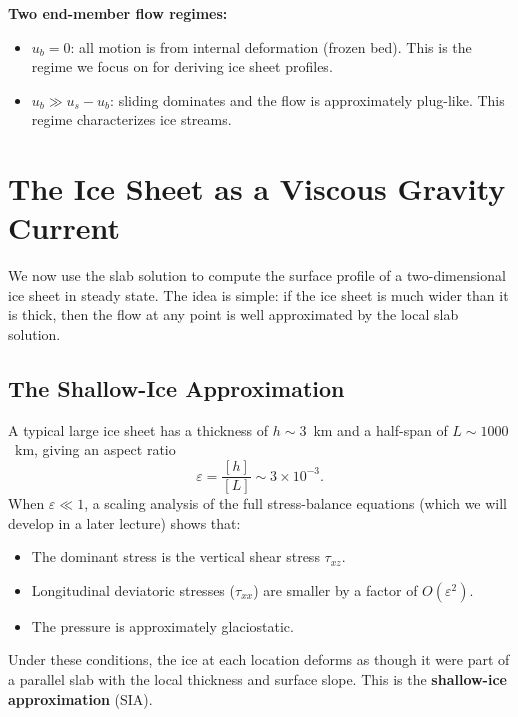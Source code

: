 \documentclass[11pt]{article}
\begin{document}

\medskip
\noindent\textbf{Two end-member flow regimes:}
\begin{itemize}
  \item $u_b = 0$: all motion is from internal deformation (frozen bed).  This is the regime we focus on for deriving ice sheet profiles.
  \item $u_b \gg u_s - u_b$: sliding dominates and the flow is approximately plug-like.  This regime characterizes ice streams.
\end{itemize}

\section{The Ice Sheet as a Viscous Gravity Current}
\label{sec:gravity_current}

We now use the slab solution to compute the surface profile of a two-dimensional ice sheet in steady state.  The idea is simple: if the ice sheet is much wider than it is thick, then the flow at any point is well approximated by the local slab solution.

\subsection{The Shallow-Ice Approximation}

A typical large ice sheet has a thickness of $h \sim 3$~km and a half-span of $L \sim 1000$~km, giving an aspect ratio
\begin{equation}
  \varepsilon = \frac{[h]}{[L]} \sim 3 \times 10^{-3}.
\end{equation}
When $\varepsilon \ll 1$, a scaling analysis of the full stress-balance equations (which we will develop in a later lecture) shows that:
\begin{itemize}
  \item The dominant stress is the vertical shear stress $\tau_{xz}$.
  \item Longitudinal deviatoric stresses ($\tau_{xx}$) are smaller by a factor of $O(\varepsilon^2)$.
  \item The pressure is approximately glaciostatic.
\end{itemize}
Under these conditions, the ice at each location deforms as though it were part of a parallel slab with the local thickness and surface slope.  This is the \textbf{shallow-ice approximation} (SIA).
\end{document}
